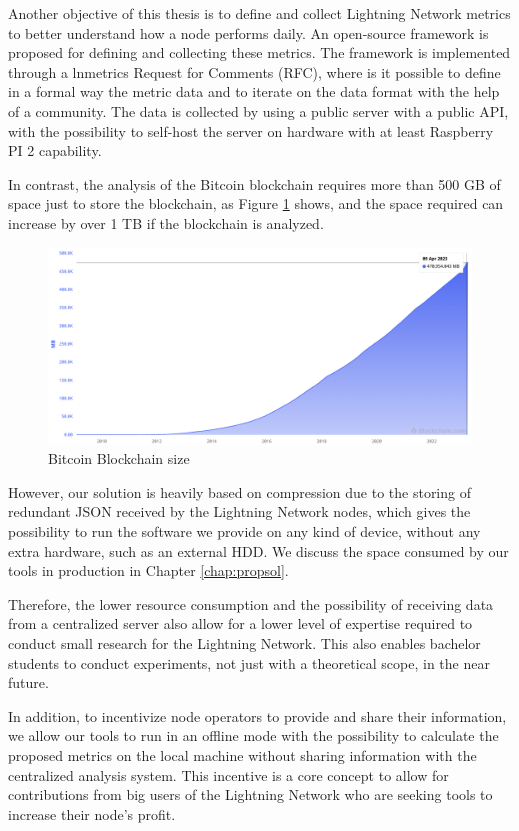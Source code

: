 Another objective of this thesis is to define and collect Lightning Network
metrics to better understand how a node performs daily. An open-source
framework is proposed for defining and collecting these metrics. The framework
is implemented through a lnmetrics Request for Comments (RFC), where is it possible to define
in a formal way the metric data and to iterate on the data format with the help of a community.
The data is collected by using a public server with a public API, with the possibility to
self-host the server on hardware with at least Raspberry PI 2 capability.

In contrast, the analysis of the Bitcoin blockchain requires more than
500 GB of space just to store the blockchain, as Figure \ref{fig:blockchain_size} shows,
and the space required can increase by over 1 TB if the blockchain is analyzed.

\begin{figure}[h]
  \begin{center}
    \includegraphics[width=0.6\columnwidth]{imgs/bitcoin-blockchain-size.png}
  \end{center}
  \caption{Bitcoin Blockchain size}
  \label{fig:blockchain_size}
\end{figure}

However, our solution is heavily based on compression due to the storing of redundant JSON received
by the Lightning Network nodes, which gives the possibility to run the software we provide on
any kind of device, without any extra hardware, such as an external HDD. We discuss the space
consumed by our tools in production in Chapter \ref{chap:propsol}.

Therefore, the lower resource consumption and the possibility of receiving data from a
centralized server also allow for a lower level of expertise required to conduct small
research for the Lightning Network. This also enables bachelor students to conduct
experiments, not just with a theoretical scope, in the near future.

In addition, to incentivize node operators to provide and share their information, we allow our
tools to run in an offline mode with the possibility to calculate the proposed metrics on the
local machine without sharing information with the centralized analysis system. This incentive
is a core concept to allow for contributions from big users of the Lightning Network who are
seeking tools to increase their node's profit.

